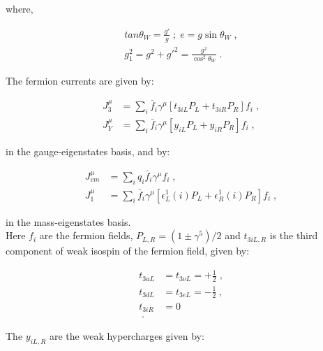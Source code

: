 \noindent where,

 \begin{equation}
 \begin{split}
  tan \theta_{W} = \frac{g\prime}{g} \; ; \;  e = g \sin \theta_{W} \; , \\
    g_{1}^{2} = g^{2} + g\prime^{2} = \frac{g^{2}}{\cos ^{2} \theta_{W}} \; .
 \end{split}
 \end{equation}

\noindent The fermion currents are given by:

\begin{equation}
\begin{split}
 J_{3}^{\mu} &= \sum_{i} \bar{f}_{i} \gamma^{\mu} \left[t_{3iL} P_{L} + t_{3iR} P_{R} \right] f_{i} \; , \\
 J_{Y}^{\mu} &= \sum_{i} \bar{f}_{i} \gamma^{\mu} \left[y_{iL} P_{L} + y_{iR} P_{R} \right] f_{i} \; ,
\end{split}
\end{equation}

\noindent in the gauge-eigenstates basis, and by:

\begin{equation}
\begin{split}
 J_{em}^{\mu} &= \sum_{i} q_{i} \bar{f}_{i} \gamma^{\mu} f_{i}  \; , \\
 J_{1}^{\mu} &= \sum_{i} \bar{f}_{i} \gamma^{\mu} \left[\epsilon_{L}^{1}(i) P_{L} + \epsilon_{R}^{1}(i) P_{R} \right] f_{i} \; , 
\end{split}
\end{equation}

\noindent in the mass-eigenstates basis.\\

\noindent Here $f_{i}$ are the fermion fields, $P_{L,R}= (1 \pm \gamma^{5})/2$ and $t_{3iL,R}$ is the third component
of weak isospin of the fermion field, given by:

 \begin{equation}
 \begin{split}
 t_{3u L} &= t_{3\nu L} = +\frac{1}{2}  \; ,  \\
 t_{3d L} &= t_{3 e L} = -\frac{1}{2}   \; ,   \\
 t_{3iR} &= 0 \\  \; .
 \end{split}
 \end{equation}

 \noindent The $y_{iL,R}$ are the weak hypercharges given by:
 
